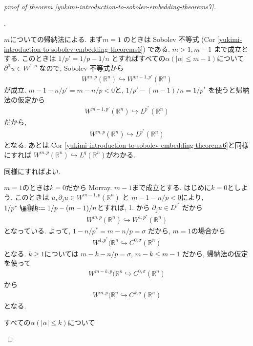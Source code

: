 \documentclass[openany, a4paper, oneside]{book}
\makeatletter
\newcounter{enum2}
\renewenvironment{enumerate}{%
\begin{list}%
{%
\arabic{enum2}.\ \,%
}%
{%
\usecounter{enum2}
\setlength{\itemindent}{0pt}%
\setlength{\leftmargin}{6pt}%
\setlength{\rightmargin}{0pt}%
\setlength{\labelsep}{0pt}%
\setlength{\labelwidth}{6pt}%
\setlength{\itemsep}{0pt}%
\setlength{\parsep}{0pt}%
\setlength{\listparindent}{0pt}%
}
}{%
\end{list}%
}
\newcommand*{\defeq}{\mathrel{\rlap{%
\raisebox{0.3ex}{$\m@th\cdot$}}%
\raisebox{-0.3ex}{$\m@th\cdot$}}%
=}
\theoremstyle{break}
\theoremstyle{breakdefn}
\newcommand{\bbR}{\mathbb{R}}
\makeatother
\begin{document}
\begin{proof}[proof of theorem \ref{yukimi-introduction-to-sobolev-embedding-theorems7}]
\begin{enumerate}
\item $m$についての帰納法による.
   まず$m = 1$ のときは Sobolev 不等式 (Cor \ref{yukimi-introduction-to-sobolev-embedding-theorems6}) である.
   $m > 1, m-1$ まで成立とする.
   このときは $1/{p'} = 1/p - 1/n$ とすればすべての$\alpha (|\alpha| \le m-1)$について
   $\partial^{\alpha} u \in W^{1, p}$ なので, Sobolev 不等式から
   \begin{align}
    W^{m, p}(\bbR^n) \hookrightarrow W^{m-1, p'}(\bbR^n)
   \end{align}
   が成立.
   $m-1 - n/{p'} = m - n/p < 0$と, $1/{p'} - (m-1)/n = 1/{p^*}$ を使うと帰納法の仮定から
   \begin{align}
    W^{m-1, p'}(\bbR^n) \hookrightarrow L^{p^*}(\bbR^n)
   \end{align}
   だから,
   \begin{align}
    W^{m, p}(\bbR^n) \hookrightarrow L^{p^*}(\bbR^n)
   \end{align}
   となる.
   あとは Cor \ref{yukimi-introduction-to-sobolev-embedding-theorems6}と同様にすれば
   $W^{m, p}(\bbR^n) \hookrightarrow L^{q}(\bbR^n)$がわかる.
\item 同様にすればよい.
\item $m = 1$のときは$k = 0$だから Morray.
   $m-1$まで成立とする.
   はじめに$k = 0$としよう.
   このときは $u, \partial_j u \in W^{m-1, p}(\bbR^n)$ と $m-1 - n/p < 0$により,
   $1/{p^*} \defeq 1/p - (m-1)/n$とすれば, 1. から
   $\partial_j u \in L^{p^*}$ だから
   \begin{align}
    W^{m, p}(\bbR^n) \hookrightarrow W^{1, p^*}(\bbR^n)
   \end{align}
   となっている.
   よって, $1 - n/{p^*} = m - n/p = \sigma$ だから, $m = 1$の場合から
   \begin{align}
    W^{1, p^*}(\bbR^n \hookrightarrow C^{0, \sigma}(\bbR^n)
   \end{align}
   となる.
   $k \ge 1$については $m - k - n/p = \sigma$, $m - k \le m -1$ だから,
   帰納法の仮定を使って
   \begin{align}
    W^{m - k, p}(\bbR^n \hookrightarrow C^{0, \sigma}(\bbR^n)
   \end{align}
   から
   \begin{align}
    W^{m, p}(\bbR^n \hookrightarrow C^{k, \sigma}(\bbR^n)
   \end{align}
   となる.
\item すべての$\alpha (|\alpha| \le k)$について

\end{enumerate}
\end{proof}
\end{document}

